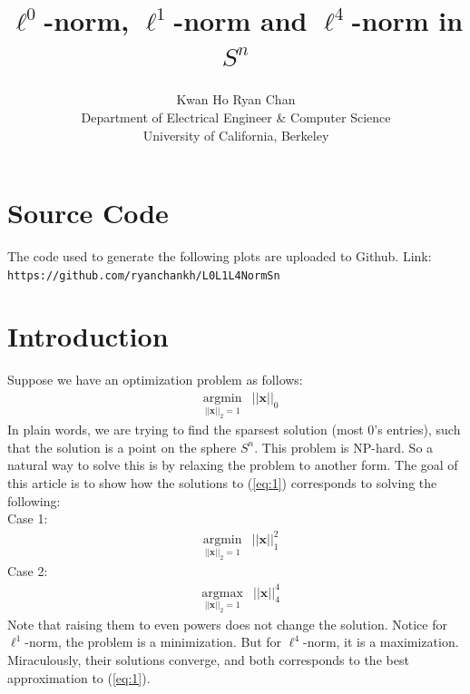 \documentclass[11pt]{article}
\begin{document}
\title{$\ell^0$-norm, $\ell^1$-norm and $\ell^4$-norm in $S^n$}
\author{Kwan Ho Ryan Chan\\Department of Electrical Engineer \& Computer Science\\University of California, Berkeley}
\maketitle

\section{Source Code}
	The code used to generate the following plots are uploaded to Github. Link: \texttt{https://github.com/ryanchankh/L0L1L4NormSn}
\section{Introduction}
Suppose we have an optimization problem as follows:
\begin{equation}
\begin{aligned}
     & \underset{||\bm{x}||_2=1}{\text{argmin}} & ||\bm{x}||_0  \label{eq:1}
\end{aligned}
\end{equation}
In plain words, we are trying to find the sparsest solution (most 0's entries), such that the solution
is a point on the sphere $S^n$. This problem is NP-hard. So a natural way to solve this is by relaxing the problem to another form. The goal of this article is to show how the solutions to (\ref{eq:1}) corresponds to solving the following: \\
Case 1:
\begin{equation}
\begin{aligned}
     & \underset{||\bm{x}||_2=1}{\text{argmin}} & ||\bm{x}||_1^2  \label{eq:2}
\end{aligned}
\end{equation}
Case 2:  
\begin{equation}
\begin{aligned}
     & \underset{||\bm{x}||_2=1}{\text{argmax}} & ||\bm{x}||_4^4  \label{eq:3}
\end{aligned}
\end{equation}
Note that raising them to even powers does not change the solution. Notice for $\ell^1$-norm, the problem is a minimization. But for $\ell^4$-norm, it is a maximization. Miraculously, their solutions converge, and both corresponds to the best approximation to (\ref{eq:1}).  
\end{document}
